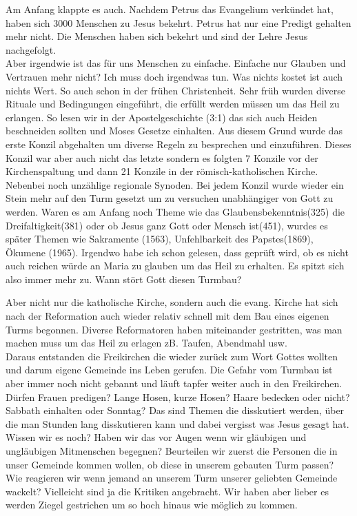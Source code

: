 \documentclass[14pt]{../../inc/mybib}
\begin{document}
    Am Anfang klappte es auch. Nachdem Petrus das Evangelium verkündet hat, haben sich 3000 Menschen zu Jesus bekehrt. Petrus hat nur eine Predigt gehalten mehr nicht. Die Menschen haben sich bekehrt und sind der Lehre Jesus nachgefolgt.\\
    Aber irgendwie ist das für uns Menschen zu einfache. Einfache nur Glauben und Vertrauen mehr nicht? Ich muss doch irgendwas tun. Was nichts kostet ist auch nichts Wert. So auch schon in der frühen Christenheit. Sehr früh wurden diverse Rituale und Bedingungen eingeführt, die erfüllt werden müssen um das Heil zu erlangen. So lesen wir in der Apostelgeschichte (3:1) das sich auch Heiden beschneiden sollten und Moses Gesetze einhalten. Aus diesem Grund wurde das erste Konzil abgehalten um diverse Regeln zu besprechen und einzuführen. Dieses Konzil war aber auch nicht das letzte sondern es folgten 7 Konzile vor der Kirchenspaltung und dann 21 Konzile in der römisch-katholischen Kirche. Nebenbei noch unzählige regionale Synoden. Bei jedem Konzil wurde wieder ein Stein mehr auf den Turm gesetzt um zu versuchen unabhängiger von Gott zu werden. Waren es am Anfang noch Theme wie das Glaubensbekenntnis(325) die Dreifaltigkeit(381) oder ob Jesus ganz Gott oder Mensch ist(451), wurdes es später Themen wie Sakramente (1563), Unfehlbarkeit des Papstes(1869), Ökumene (1965). Irgendwo habe ich schon gelesen, dass geprüft wird, ob es nicht auch reichen würde an Maria zu glauben um das Heil zu erhalten. Es spitzt sich also immer mehr zu. Wann stört Gott diesen Turmbau?

    Aber nicht nur die katholische Kirche, sondern auch die evang. Kirche hat sich nach der Reformation auch wieder relativ schnell mit dem Bau eines eigenen Turms begonnen. Diverse Reformatoren haben miteinander gestritten, was man machen muss um das Heil zu erlagen zB. Taufen, Abendmahl usw.\\
    Daraus entstanden die Freikirchen die wieder zurück zum Wort Gottes wollten und darum eigene Gemeinde ins Leben gerufen. Die Gefahr vom Turmbau ist aber immer noch nicht gebannt und läuft tapfer weiter auch in den Freikirchen. Dürfen Frauen predigen? Lange Hosen, kurze Hosen? Haare bedecken oder nicht? Sabbath einhalten oder Sonntag? Das sind Themen die disskutiert werden, über die man Stunden lang disskutieren kann und dabei vergisst was Jesus gesagt hat. Wissen wir es noch? Haben wir das vor Augen wenn wir gläubigen und ungläubigen Mitmenschen begegnen? Beurteilen wir zuerst die Personen die in unser Gemeinde kommen wollen, ob diese in unserem gebauten Turm passen? Wie reagieren wir wenn jemand an unserem Turm unserer geliebten Gemeinde wackelt? Vielleicht sind ja die Kritiken angebracht. Wir haben aber lieber es werden Ziegel gestrichen um so hoch hinaus wie möglich zu kommen.
\end{document}
